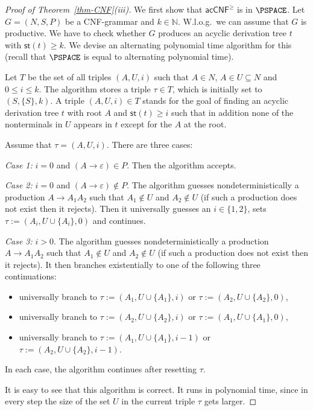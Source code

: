 \documentclass[a4paper,UKenglish,cleveref, autoref, thm-restate, numberwithinsect]{lipics-v2021}
\newcommand{\hs}{\mathsf{st}}
\newcommand{\acCNF}{\mathsf{acCNF}}
\newcommand{\CNFac}{\acCNF^\ge}
\begin{document}
 \begin{proof}[Proof of Theorem~\ref{thm-CNF}(iii)]
 We first show that $\CNFac$ is in $\PSPACE$. Let $G = (N,S, P)$ be a CNF-grammar and $k \in \mathbb{N}$.
 W.l.o.g.\ we can assume that $G$ is productive.
  We have to check whether $G$ produces an acyclic derivation tree $t$ with $\hs(t) \geq k$. 
  We devise an alternating polynomial time algorithm for this (recall that $\PSPACE$ is equal to alternating polynomial time).
  
   Let $T$ be the set of all triples $(A, U, i)$ such that $A \in N$, $A \in U \subseteq N$ and $0 \le i \le k$.
 The algorithm stores a triple $\tau \in T$, which is initially set to $(S, \{S\}, k)$.
  A triple $(A,U,i) \in T$ stands for the goal of finding
 an acyclic derivation tree $t$ with root $A$ and $\hs(t) \geq i$ such that in addition none of the 
 nonterminals in $U$ appears in $t$ except for the $A$ at the root.
 
 Assume that $\tau = (A, U, i)$. There are three cases:
 
 \medskip\noindent
 \emph{Case 1:}  $i = 0$ and $(A \to \varepsilon) \in P$. Then the algorithm accepts.
 
 \medskip\noindent
 \emph{Case 2:} $i = 0$ and $(A \to \varepsilon) \notin P$. The algorithm guesses nondeterministically a production $A \to A_1 A_2$  such that $A_1 \notin U$ and $A_2 \notin U$ (if such a production does not exist then it rejects). 
 Then it universally guesses an $i \in \{1,2\}$, sets $\tau := (A_i, U \cup \{A_i\}, 0)$ and continues.
 
 \medskip\noindent
 \emph{Case 3:} $i > 0$. The algorithm guesses nondeterministically a production $A \to A_1 A_2$  such that $A_1 \notin U$ and $A_2 \notin U$
 (if such a production does not exist then it rejects).  It then branches existentially to one of the following three continuations:
 \begin{itemize}
\item universally branch to $\tau := (A_1,  U \cup \{A_1\}, i)$ or $\tau := (A_2,  U \cup \{A_2\}, 0)$,
\item universally branch to $\tau := (A_2,  U \cup \{A_2\}, i)$ or $\tau := (A_1,  U \cup \{A_1\}, 0)$,
\item universally branch to $\tau := (A_1,  U \cup \{A_1\}, i-1)$ or $\tau := (A_2,  U \cup \{A_2\}, i-1)$.
\end{itemize}
In each case, the algorithm continues after resetting $\tau$.

It is easy to see that this algorithm is correct. It runs in polynomial time, since in every step the size of the set $U$ in the current triple $\tau$ gets larger.


\end{proof}
\end{document}
